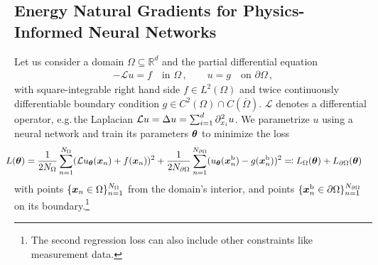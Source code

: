 \subsection{Energy Natural Gradients for Physics-Informed Neural Networks}
Let us consider a domain $\Omega\subseteq\mathbb R^d$ and the partial differential equation
\begin{align*}
  -\mathcal{L} u = f \quad \text{in }\Omega\,,
                   \qquad
  u = g \quad \text{on }\partial\Omega\,,
\end{align*}
with square-integrable right hand side $f\in L^2(\Omega)$ and twice continuously differentiable boundary condition $g\in C^2(\Omega)\cap C(\overline{\Omega})$.
$\mathcal{L}$ denotes a differential operator, e.g.\,the Laplacian $\mathcal{L} u = \Delta u = \sum_{i=1}^d \partial_{{x}_i}^2 u$.
We parametrize $u$ using a neural network and train its parameters ${\bm{\theta}}$ to minimize the loss
\begin{align}\label{eq:pinn-loss}
  \!\!\!\!\!\!
  L({\bm{\theta}})
  &=
    \frac{1}{2N_\Omega} \sum_{n=1}^{N_\Omega} (\mathcal{L} u_{\bm{\theta}}({\bm{x}}_n) + f({\bm{x}}_n))^2
    +
    \frac{1}{2N_{\partial\Omega}}\sum_{n=1}^{N_{\partial\Omega}} ( u_{\bm{\theta}}({\bm{x}}^\text{b}_n) - g({\bm{x}}^\text{b}_n))^2
    \eqqcolon
    L_\Omega({\bm{\theta}}) + L_{\partial\Omega}({\bm{\theta}})
\end{align}
with points $\{{\bm{x}}_n \in \Omega \}_{n=1}^{N_\Omega}$ from the domain's interior, and points $\{{\bm{x}}^\text{b}_n \in \partial\Omega \}_{n=1}^{N_{\partial\Omega}}$ on its boundary.\footnote{The second regression loss can also include other constraints like measurement data.}

